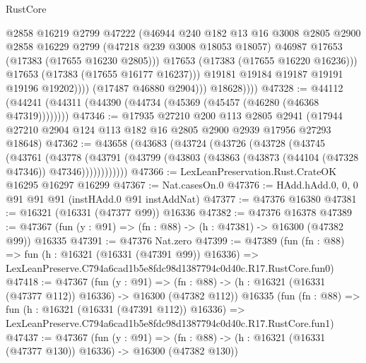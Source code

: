 \begin{lexlean}{RustCore}
\begin{coremodule}
                            @2858
                            @16219
                            @2799
                            @47222
                            (@46944
                              @240
                              @182
                              @13
                              @16
                              @3008
                              @2805
                              @2900
                              @2858
                              @16229
                              @2799
                              (@47218 @239 @3008 @18053 @18057)
                              @46987
                              @17653
                              (@17383 (@17655 @16230 @2805)))
                            @17653
                            (@17383 (@17655 @16220 @16236)))
                          @17653
                          (@17383 (@17655 @16177 @16237)))
                        @19181
                        @19184
                        @19187
                        @19191
                        @19196
                        @19202))))
                (@17487 @46880 @2904)))
            @18628))))
@47328 := @44112 (@44241 (@44311 (@44390 (@44734 (@45369 (@45457 (@46280 (@46368 @47319))))))))
@47346 := @17935
    @27210
    @200
    @113
    @2805
    @2941
    (@17944 @27210 @2904 @124 @113 @182 @16 @2805 @2900 @2939 @17956 @27293 @18648)
@47362 := @43658
    (@43683
      (@43724
        (@43726
          (@43728
            (@43745
              (@43761
                (@43778
                  (@43791
                    (@43799 (@43803 (@43863 (@43873 (@44104 (@47328 @47346)) @47346))))))))))))
@47366 := LexLeanPreservation.Rust.CrateOK @16295 @16297 @16299
@47367 := Nat.casesOn.{0}
@47376 := HAdd.hAdd.{0, 0, 0} @91 @91 @91 (instHAdd.{0} @91 instAddNat)
@47377 := @47376 @16380
@47381 := @16321 (@16331 (@47377 @99)) @16336
@47382 := @47376 @16378
@47389 := @47367 (fun (y : @91) => (fn : @88) -> (h : @47381) -> @16300 (@47382 @99)) @16335
@47391 := @47376 Nat.zero
@47399 := @47389
    (fun (fn : @88) =>
    fun (h : @16321 (@16331 (@47391 @99)) @16336) =>
    LexLeanPreserve.C794a6cad1b5e8fdc98d1387794c0d40c.R17.RustCore.fun0)
@47418 := @47367
    (fun (y : @91) =>
    (fn : @88) -> (h : @16321 (@16331 (@47377 @112)) @16336) -> @16300 (@47382 @112))
    @16335
    (fun (fn : @88) =>
    fun (h : @16321 (@16331 (@47391 @112)) @16336) =>
    LexLeanPreserve.C794a6cad1b5e8fdc98d1387794c0d40c.R17.RustCore.fun1)
@47437 := @47367
    (fun (y : @91) =>
    (fn : @88) -> (h : @16321 (@16331 (@47377 @130)) @16336) -> @16300 (@47382 @130))

\end{coremodule}
\end{lexlean}
